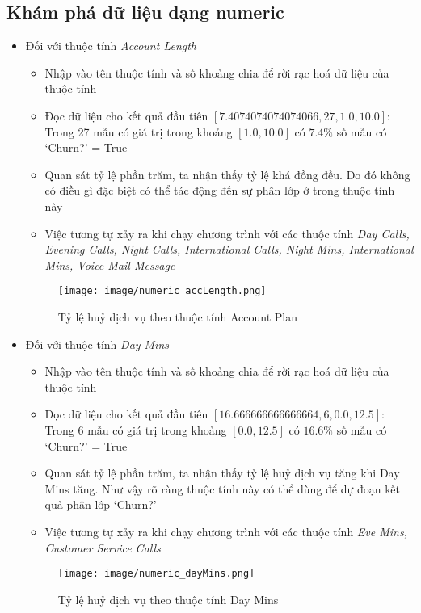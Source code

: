 \documentclass[a4paper, 12pt]{article}
\begin{document}
\subsection{Khám phá dữ liệu dạng numeric}

\begin{itemize}
    \item Đối với thuộc tính \textit{Account Length}
    \begin{itemize}
        \item Nhập vào tên thuộc tính và số khoảng chia để rời rạc hoá dữ liệu của thuộc tính
        \item Đọc dữ liệu cho kết quả đầu tiên $[7.4074074074074066, 27, 1.0, 10.0]$: Trong 27 mẫu có giá trị trong khoảng $[1.0, 10.0]$ có $7.4\%$ số mẫu có `Churn?' = True
        \item Quan sát tỷ lệ phần trăm, ta nhận thấy tỷ lệ khá đồng đều. Do đó không có điều gì đặc biệt có thể tác động đến sự phân lớp ở trong thuộc tính này
        \item Việc tương tự xảy ra khi chạy chương trình với các thuộc tính \textit{Day Calls, Evening Calls, Night Calls, International Calls, Night Mins, International Mins, Voice Mail Message}
    \end{itemize}
    \begin{figure}[H]
        \begin{center}
            \texttt{[image: image/numeric\_accLength.png]}
            \caption{Tỷ lệ huỷ dịch vụ theo thuộc tính Account Plan}
        \end{center}
    \end{figure}

    \item Đối với thuộc tính \textit{Day Mins}
    \begin{itemize}
        \item Nhập vào tên thuộc tính và số khoảng chia để rời rạc hoá dữ liệu của thuộc tính
        \item Đọc dữ liệu cho kết quả đầu tiên $[16.666666666666664, 6, 0.0, 12.5]$: Trong 6 mẫu có giá trị trong khoảng $[0.0, 12.5]$ có $16.6\%$ số mẫu có `Churn?' = True
        \item Quan sát tỷ lệ phần trăm, ta nhận thấy tỷ lệ huỷ dịch vụ tăng khi Day Mins tăng. Như vậy rõ ràng thuộc tính này có thể dùng để dự đoạn kết quả phân lớp `Churn?'
        \item Việc tương tự xảy ra khi chạy chương trình với các thuộc tính \textit{Eve Mins, Customer Service Calls}
    \end{itemize}
    \begin{figure}[H]
        \begin{center}
            \texttt{[image: image/numeric\_dayMins.png]}
            \caption{Tỷ lệ huỷ dịch vụ theo thuộc tính Day Mins}
        \end{center}
    \end{figure}
\end{itemize}
\end{document}
